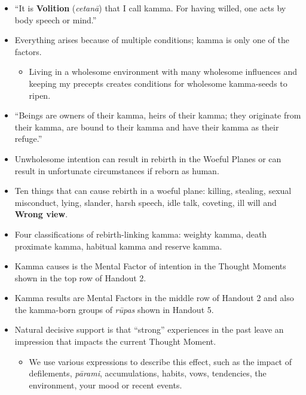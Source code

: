\begin{itemize}

\item “It is \textbf{Volition} (\textit{cetanā}) that I call kamma. For having willed, one acts by body speech or mind.”

\item Everything arises because of multiple conditions; kamma is only one of the factors.

\begin{itemize}

\item Living in a wholesome environment with many wholesome influences and keeping my precepts creates conditions for wholesome kamma-seeds to ripen.

\end{itemize}

\item “Beings are owners of their kamma, heirs of their kamma; they originate from their kamma, are bound to their kamma and have their kamma as their refuge.”

\item Unwholesome intention can result in rebirth in the Woeful Planes or can result in unfortunate circumstances if reborn as human.

\item Ten things that can cause rebirth in a woeful plane: killing, stealing, sexual misconduct, lying, slander, harsh speech, idle talk, coveting, ill will and \textbf{Wrong view}.

\item Four classifications of rebirth-linking kamma: weighty kamma, death proximate kamma, habitual kamma and reserve kamma.

\item Kamma causes is the Mental Factor of intention in the Thought Moments shown in the top row of Handout 2.

\item Kamma results are Mental Factors in the middle row of Handout 2 and also the kamma-born groups of \textit{rūpas} shown in Handout 5.

\item Natural decisive support is that “strong” experiences in the past leave an impression that impacts the current Thought Moment.

\begin{itemize}

\item We use various expressions to describe this effect, such as the impact of defilements, \textit{pārami}, accumulations, habits, vows, tendencies, the environment, your mood or recent events.


\end{itemize}
\end{itemize}
